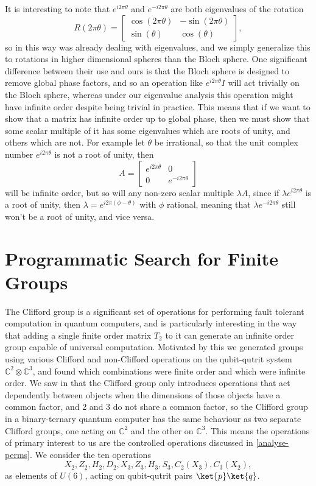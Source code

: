 It is interesting to note that $e^{i 2\pi\theta}$ and $e^{-i 2\pi\theta}$ are both eigenvalues of the rotation
\[R(2\pi \theta) = \left[\begin{matrix}
	\cos(2\pi\theta) & -\sin(2\pi\theta) \\
	\sin(\theta) & \cos(\theta)
\end{matrix}\right],\]
so in this way \cite{universal-qubit} was already dealing with eigenvalues, and we simply generalize this to rotations in higher dimensional spheres than the Bloch sphere. One significant difference between their use and ours is that the Bloch sphere is designed to remove global phase factors, and so an operation like $e^{i2\pi\theta}I$ will act trivially on the Bloch sphere, whereas under our eigenvalue analysis this operation might have infinite order despite being trivial in practice. This means that if we want to show that a matrix has infinite order up to global phase, then we must show that some scalar multiple of it has some eigenvalues which are roots of unity, and others which are not. For example let $\theta$ be irrational, so that the unit complex number $e^{i2\pi\theta}$ is not a root of unity, then
\[A = \left[\begin{matrix}
	e^{i2\pi\theta} & 0 \\
	0 & e^{-i2\pi\theta}
\end{matrix}\right]\]
will be infinite order, but so will any non-zero scalar multiple $\lambda A$, since if $\lambda e^{i2\pi\theta}$ is a root of unity, then $\lambda = e^{i2\pi(\phi - \theta)}$ with $\phi$ rational, meaning that $\lambda e^{-i2\pi\theta}$ still won't be a root of unity, and vice versa.

\section{Programmatic Search for Finite Groups}\label{prog-search}
The Clifford group is a significant set of operations for performing fault tolerant computation in quantum computers, and is particularly interesting in the way that adding a single finite order matrix $T_2$ to it can generate an infinite order group capable of universal computation. Motivated by this we generated groups using various Clifford and non-Clifford operations on the qubit-qutrit system $\mathbb{C}^2 \otimes \mathbb{C}^3$, and found which combinations were finite order and which were infinite order. We saw in \cite{tolar-clifford} that the Clifford group only introduces operations that act dependently between objects when the dimensions of those objects have a common factor, and 2 and 3 do not share a common factor, so the Clifford group in a binary-ternary quantum computer has the same behaviour as two separate Clifford groups, one acting on $\mathbb{C}^2$ and the other on $\mathbb{C}^3$. This means the operations of primary interest to us are the controlled operations discussed in \autoref{analyse-perms}. We consider the ten operations
\[X_2, Z_2, H_2, D_2, X_3, Z_3, H_3, S_3, C_2(X_3), C_3(X_2),\]
as elements of $U(6)$, acting on qubit-qutrit pairs $\ket{p}\ket{q}$.

